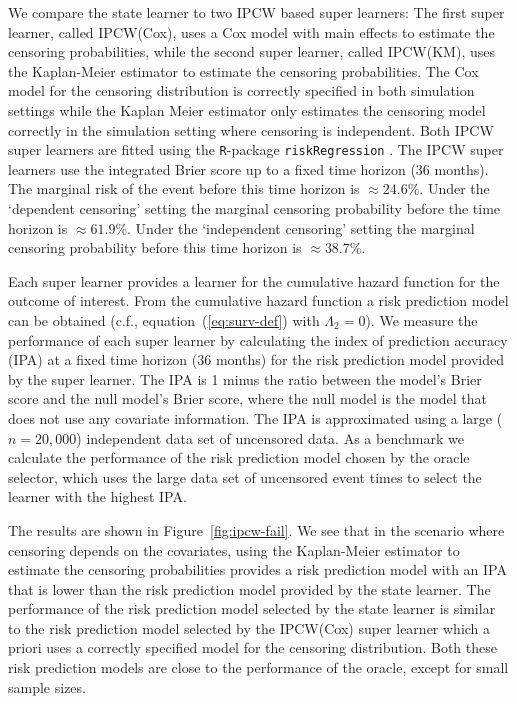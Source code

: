 We compare the state learner to two IPCW based super learners: The
first super learner, called IPCW(Cox), uses a Cox model with main
effects to estimate the censoring probabilities, while the second
super learner, called IPCW(KM), uses the Kaplan-Meier estimator to
estimate the censoring probabilities. The Cox model for the censoring
distribution is correctly specified in both simulation settings while
the Kaplan Meier estimator only estimates the censoring model
correctly in the simulation setting where censoring is
independent. Both IPCW super learners are fitted using the
\texttt{R}-package \texttt{riskRegression}
\citep{Gerds_Ohlendorff_Ozenne_2023}.
%
%
The IPCW super learners use the integrated Brier score up to a fixed time
horizon (36 months). The marginal risk of the event before this time horizon is
\(\approx 24.6\)\%. Under the `dependent censoring' setting the marginal
censoring probability before the time horizon is \(\approx 61.9\)\%. Under the
`independent censoring' setting the marginal censoring probability before this
time horizon is \( \approx 38.7 \)\%.

Each super learner provides a learner for the cumulative hazard
function for the outcome of interest. From the cumulative hazard
function a risk prediction model can be obtained (c.f.,
equation~(\ref{eq:surv-def}) with $\Lambda_2 = 0$). We measure the
performance of each super learner by calculating the index of
prediction accuracy (IPA) \citep{kattan2018index} at a fixed time
horizon (36 months) for the risk prediction model provided by the
super learner. The IPA is 1 minus the ratio between the model's Brier
score and the null model's Brier score, where the null model is the
model that does not use any covariate information. The IPA is
approximated using a large (\( n = 20,000 \)) independent data set of
uncensored data. As a benchmark we calculate the performance of the
risk prediction model chosen by the oracle selector, which uses the
large data set of uncensored event times to select the learner with
the highest IPA.

The results are shown in Figure~\ref{fig:ipcw-fail}. We see that in
the scenario where censoring depends on the covariates, using the
Kaplan-Meier estimator to estimate the censoring probabilities
provides a risk prediction model with an IPA that is lower than the
risk prediction model provided by the state learner. The performance
of the risk prediction model selected by the state learner is similar
to the risk prediction model selected by the IPCW(Cox) super learner
which a priori uses a correctly specified model for the censoring
distribution. Both these risk prediction models are close to the
performance of the oracle, except for small sample sizes.

